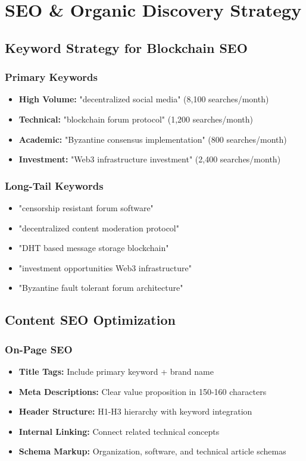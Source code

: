 \documentclass[12pt,a4paper]{article}
\begin{document}
\section{SEO \& Organic Discovery Strategy}

\subsection{Keyword Strategy for Blockchain SEO}

\subsubsection{Primary Keywords}
\begin{itemize}
    \item \textbf{High Volume:} "decentralized social media" (8,100 searches/month)
    \item \textbf{Technical:} "blockchain forum protocol" (1,200 searches/month)
    \item \textbf{Academic:} "Byzantine consensus implementation" (800 searches/month)
    \item \textbf{Investment:} "Web3 infrastructure investment" (2,400 searches/month)
\end{itemize}

\subsubsection{Long-Tail Keywords}
\begin{itemize}
    \item "censorship resistant forum software"
    \item "decentralized content moderation protocol"
    \item "DHT based message storage blockchain"
    \item "investment opportunities Web3 infrastructure"
    \item "Byzantine fault tolerant forum architecture"
\end{itemize}

\subsection{Content SEO Optimization}

\subsubsection{On-Page SEO}
\begin{itemize}
    \item \textbf{Title Tags:} Include primary keyword + brand name
    \item \textbf{Meta Descriptions:} Clear value proposition in 150-160 characters
    \item \textbf{Header Structure:} H1-H3 hierarchy with keyword integration
    \item \textbf{Internal Linking:} Connect related technical concepts
    \item \textbf{Schema Markup:} Organization, software, and technical article schemas
\end{itemize}
\end{document}
